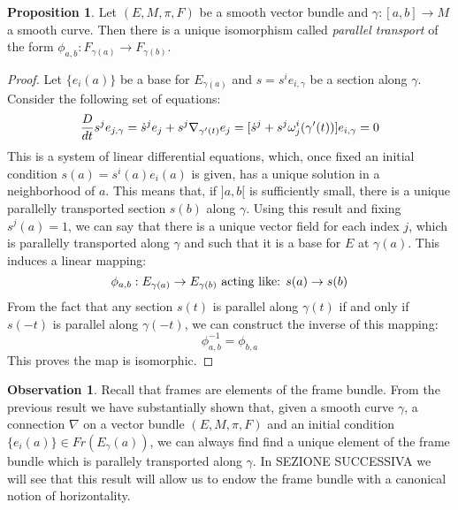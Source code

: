\documentclass[12pt,a4paper]{report}
\theoremstyle{definition}
\theoremstyle{Theorem}
\newtheorem{Prop}[Def]{Proposition}
\theoremstyle{definition}
\theoremstyle{definition}
\newtheorem{Obs}[Def]{Observation}
\begin{document}
	\begin{Prop}
		Let $(E,M,\pi,F)$ be a smooth vector bundle and $\gamma:[a,b]\rightarrow M$ a smooth curve. Then there is a unique isomorphism called \textit{parallel transport} of the form $\phi_{a,b}:F_{\gamma(a)}\rightarrow F_{\gamma(b)}$.
	\end{Prop}
	\begin{proof}
		Let $\{e_i(a)\}$ be a base for $E_{\gamma(a)}$ and $s=s^ie_{i,\gamma}$ be a section along $\gamma$. Consider the following set of equations:
		$${D\over dt}{s^je_{j,\gamma}}=\dot{s}^je_j+s^j\nabla_{\gamma'(t)}e_j=[\dot{s}^j+s^j\omega^i_j(\gamma'(t))]e_{i,\gamma}=0$$
		This is a system of linear differential equations, which, once fixed an initial condition $s(a)=s^i(a)e_i(a)$ is given, has a unique solution in a neighborhood of $a$.  This means that, if $]a,b[$ is sufficiently small, there is a unique parallelly transported section $s(b)$ along $\gamma$. Using this result and fixing $s^j(a)=1$, we can say that there is a unique vector field for each index $j$, which is parallelly transported along $\gamma$ and such that it is a base for $E$ at $\gamma(a)$. This induces a linear mapping:
		$$\phi_{a,b}:E_{\gamma(a)}\rightarrow E_{\gamma(b)}\hbox{ acting like: } s(a)\rightarrow s(b)$$
		From the fact that any section $s(t)$ is parallel along $\gamma(t)$ if and only if $s(-t)$ is parallel along $\gamma(-t)$, we can construct the inverse of this mapping:
		$$\phi^{-1}_{a,b}=\phi_{b,a}$$
		This proves the map is isomorphic.
	\end{proof}
	\begin{Obs}
		Recall that frames are elements of the frame bundle. From the previous result we have substantially shown that, given a smooth curve $\gamma$, a connection $\nabla$ on a vector bundle $(E,M,\pi,F)$ and an initial condition $\{e_i(a)\}\in Fr(E_\gamma(a))$, we can always find find a unique element of the frame bundle which is parallely transported along $\gamma$. In SEZIONE SUCCESSIVA we will see that this result will allow us to endow the frame bundle with a canonical notion of horizontality.
	\end{Obs}
	\begin{comment}
		We now look at the notion of parallel transport on the tangent bundle of a manifold.
		\section{The parallel transport on the tangent bundle}
		In this section we will use the previous results to study the notion of parallel transport on the tangent bundle of a smooth manifold. More information on this topic can be found in [2] chap.3 pag. 95-102.
	\end{comment}
\end{document}
